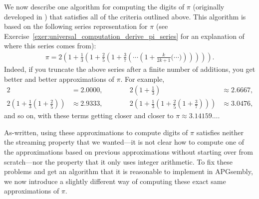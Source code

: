 We now describe one algorithm for computing the digits of $\pi$ (originally developed in \cite{Gib06}) that satisfies all of the criteria outlined above. This algorithm is based on the following series representation for $\pi$ (see Exercise~\ref{exer:universal_computation_derive_pi_series} for an explanation of where this series comes from):
\begin{align}\label{eq:pi_series}
\pi = 2\left(1 + \frac{1}{3}\left( 1 + \frac{2}{5}\left( 1 + \frac{3}{7}\left( \cdots \left( 1 + \frac{k}{2k+1}\Big( \cdots \Big) \right)\right)\right)\right)\right).
\end{align}
Indeed, if you truncate the above series after a finite number of additions, you get better and better approximations of $\pi$. For example,
\begin{equation}\label{eq:pi_approx}
\begin{alignedat}{2}
2 & = 2.0000, \qquad \quad {} & 2\left(1 + \frac{1}{3}\right) & \approx 2.6667, \\
2\left(1 + \frac{1}{3}\left(1 + \frac{2}{5}\right)\right) & \approx 2.9333, \qquad \quad {} & 2\left(1 + \frac{1}{3}\left(1 + \frac{2}{5}\left(1 + \frac{3}{7}\right)\right)\right) & \approx 3.0476,
\end{alignedat}
\end{equation}
and so on, with these terms getting closer and closer to $\pi \approx 3.14159\ldots$.

As-written, using these approximations to compute digits of $\pi$ satisfies neither the streaming property that we wanted---it is not clear how to compute one of the approximations based on previous approximations without starting over from scratch---nor the property that it only uses integer arithmetic. To fix these problems and get an algorithm that it is reasonable to implement in APGsembly, we now introduce a slightly different way of computing these exact same approximations of $\pi$.

